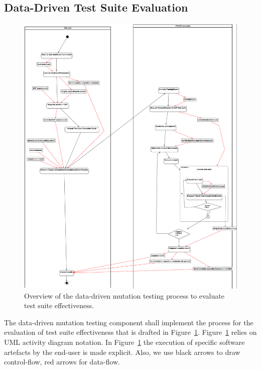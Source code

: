\subsection{Data-Driven Test Suite Evaluation}

\begin{figure}[h]
  \centering
	\includegraphics[width=\textwidth]{images/png/Activity1!DataDrivenTestSuiteEvaluation_3.png}
      \caption{Overview of the data-driven mutation testing process to evaluate test suite effectiveness.}
      \label{fig:process:dataDriven:evaluation}
\end{figure}

The data-driven mutation testing component shall implement the process for the evaluation of test suite effectiveness that is drafted in Figure~\ref{fig:process:dataDriven:evaluation}. Figure~\ref{fig:process:dataDriven:evaluation} relies on UML activity diagram notation. In Figure~\ref{fig:process:dataDriven:evaluation} the execution of specific software artefacts by the end-user is made explicit. Also, we use black arrows to draw control-flow, red arrows for data-flow. 

